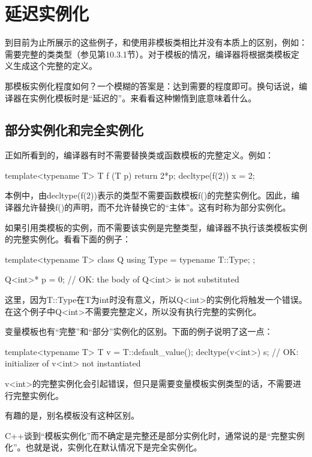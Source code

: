 \section{延迟实例化}

到目前为止所展示的这些例子，和使用非模板类相比并没有本质上的区别，例如：需要完整的类类型（参见第10.3.1节）。对于模板的情况，编译器将根据类模板定义生成这个完整的定义。

那模板实例化程度如何？一个模糊的答案是：达到需要的程度即可。换句话说，编译器在实例化模板时是“延迟的”。来看看这种懒惰到底意味着什么。

\subsection{部分实例化和完全实例化}

正如所看到的，编译器有时不需要替换类或函数模板的完整定义。例如：

\begin{cpp}
template<typename T> T f (T p) { return 2*p; }
decltype(f(2)) x = 2;
\end{cpp}

本例中，由decltype(f(2))表示的类型不需要函数模板f()的完整实例化。因此，编译器允许替换f()的声明，而不允许替换它的“主体”。这有时称为部分实例化。

如果引用类模板的实例，而不需要该实例是完整类型，编译器不执行该类模板实例的完整实例化。看看下面的例子：

\begin{cpp}
template<typename T> class Q {
	using Type = typename T::Type;
};

Q<int>* p = 0; // OK: the body of Q<int> is not substituted
\end{cpp}

这里，因为T::Type在T为int时没有意义，所以Q<int>的实例化将触发一个错误。在这个例子中Q<int>不需要完整定义，所以没有执行完整的实例化。

变量模板也有“完整”和“部分”实例化的区别。下面的例子说明了这一点：

\begin{cpp}
template<typename T> T v = T::default_value();
decltype(v<int>) s; // OK: initializer of v<int> not instantiated
\end{cpp}

v<int>的完整实例化会引起错误，但只是需要变量模板实例类型的话，不需要进行完整实例化。

有趣的是，别名模板没有这种区别。

C++谈到“模板实例化”而不确定是完整还是部分实例化时，通常说的是“完整实例化”。也就是说，实例化在默认情况下是完全实例化。


